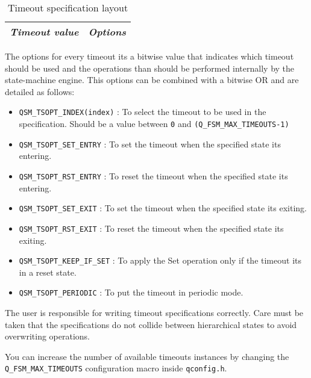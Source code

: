\begin{table}[H]
\centering
\begin{tabular}{||c c||} 
 \hline
 \textit{Timeout value} & \textit{Options} \\ [0.5ex] 
 \hline
\end{tabular}
\caption{Timeout specification layout}
\label{timeoutspec_table_layout}
\end{table}

The options for every timeout its a bitwise value that indicates which timeout should be used and the operations than should be performed internally by the state-machine engine. This options can be combined with a bitwise OR and are detailed as follows:

\begin{itemize}
    \item \lstinline{QSM_TSOPT_INDEX(index)} : To select the timeout to be used in the specification. Should be a value between \lstinline{0} and \lstinline{(Q_FSM_MAX_TIMEOUTS-1)}
    \item \lstinline{QSM_TSOPT_SET_ENTRY} : To set the timeout when the specified state its entering.
    \item \lstinline{QSM_TSOPT_RST_ENTRY} :  To reset the timeout when the specified state its entering.
    \item \lstinline{QSM_TSOPT_SET_EXIT} : To set the timeout when the specified state its exiting.
    \item \lstinline{QSM_TSOPT_RST_EXIT} : To reset the timeout when the specified state its exiting.
    \item \lstinline{QSM_TSOPT_KEEP_IF_SET} : To apply the Set operation only if the timeout its in a reset state.
    \item \lstinline{QSM_TSOPT_PERIODIC} : To put the timeout in periodic mode.
\end{itemize}

\begin{tcolorbox}
\HandRight The user is responsible for writing timeout specifications correctly. Care must be taken that the specifications do not collide between hierarchical states to avoid overwriting operations.
\end{tcolorbox}

\begin{tcolorbox}
\HandRight You can increase the number of available timeouts instances by changing the \lstinline{Q_FSM_MAX_TIMEOUTS} configuration macro inside \lstinline{qconfig.h}. 
\end{tcolorbox}

